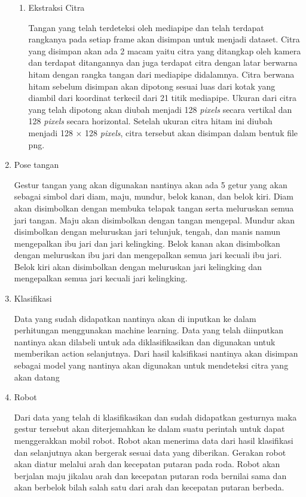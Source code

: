\begin{enumerate}
\begin{enumerate}
  \item Ekstraksi Citra \par
  Tangan yang telah terdeteksi oleh mediapipe dan telah terdapat rangkanya pada setiap frame akan disimpan untuk menjadi dataset. Citra yang disimpan akan ada 2 macam yaitu citra yang ditangkap oleh kamera dan terdapat ditangannya dan juga terdapat citra dengan latar berwarna hitam dengan rangka tangan dari mediapipe didalamnya. Citra berwana hitam sebelum disimpan akan dipotong sesuai luas dari kotak yang diambil dari koordinat terkecil dari 21 titik mediapipe. Ukuran dari citra yang telah dipotong akan diubah menjadi 128 {\textit{pixels}} secara vertikal dan 128 {\textit{pixels}} secara horizontal. Setelah ukuran citra hitam ini diubah menjadi 128 $\times$ 128 {\textit{pixels}}, citra tersebut akan disimpan dalam bentuk file png.
\end{enumerate}

  \item Pose tangan \par
  Gestur tangan yang akan digunakan nantinya akan ada 5 getur yang akan sebagai simbol dari diam, maju, mundur, belok kanan, dan belok kiri. Diam akan disimbolkan dengan membuka telapak tangan serta meluruskan semua jari tangan. Maju akan disimbolkan dengan tangan mengepal. Mundur akan disimbolkan dengan meluruskan jari telunjuk, tengah, dan manis namun mengepalkan ibu jari dan jari kelingking. Belok kanan akan disimbolkan dengan meluruskan ibu jari dan mengepalkan semua jari kecuali ibu jari. Belok kiri akan disimbolkan dengan meluruskan jari kelingking dan mengepalkan semua jari kecuali jari kelingking.
  
  \item Klasifikasi \par
  Data yang sudah didapatkan nantinya akan di inputkan ke dalam perhitungan menggunakan machine learning. Data yang telah diinputkan nantinya akan dilabeli untuk ada diklasifikasikan dan digunakan untuk memberikan action selanjutnya. Dari hasil kalsifikasi nantinya akan disimpan sebagai model yang nantinya akan digunakan untuk mendeteksi citra yang akan datang
  
  \item Robot \par
  Dari data yang telah di klasifikasikan dan sudah didapatkan gesturnya maka gestur tersebut akan diterjemahkan ke dalam suatu perintah untuk dapat menggerakkan mobil robot. Robot akan menerima data dari hasil klasifikasi dan selanjutnya akan bergerak sesuai data yang diberikan. Gerakan robot akan diatur melalui arah dan kecepatan putaran pada roda. Robot akan berjalan maju jikalau arah dan kecepatan putaran roda bernilai sama dan akan berbelok bilah salah satu dari arah dan kecepatan putaran berbeda.
\end{enumerate}


